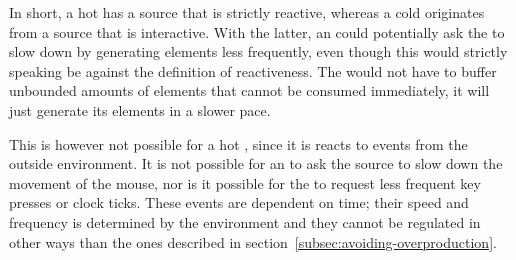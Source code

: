 In short, a hot \obs has a source that is strictly reactive, whereas a cold \obs originates from a source that is interactive. With the latter, an \obv could potentially ask the \obs to slow down by generating elements less frequently, even though this would strictly speaking be against the definition of reactiveness. The \obs would not have to buffer unbounded amounts of elements that cannot be consumed immediately, it will just generate its elements in a slower pace.

This is however not possible for a hot \obs, since it is reacts to events from the outside environment. It is not possible for an \obv to ask the source to slow down the movement of the mouse, nor is it possible for the \obv to request less frequent key presses or clock ticks. These events are dependent on time; their speed and frequency is determined by the environment \cite{berry1991-Reactive} and they cannot be regulated in other ways than the ones described in section~\ref{subsec:avoiding-overproduction}.